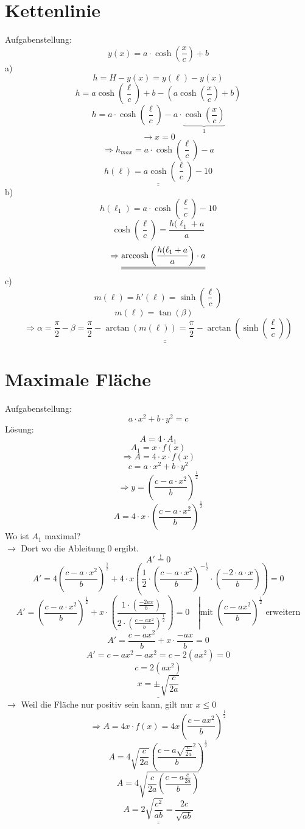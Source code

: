 \section{Kettenlinie}
Aufgabenstellung: 
\[y(x) = a \cdot \cosh\left(\frac{x}{c}\right) + b\]
a)\\
\[h = H - y(x) = y(\ell) - y(x)\]
\[h = a \cosh\left(\frac{\ell}{c}\right) + b - \left(a \cosh\left(\frac{x}{c}\right) + b\right)\]
\[h = a \cdot \cosh\left(\frac{\ell}{c}\right) - a \cdot \underbrace{\cosh\left(\frac{x}{c}\right)}_1\]
\[\rightarrow x = 0\]
\[\Rightarrow h_{max} = a \cdot \cosh\left(\frac{\ell}{c}\right)-a\]
\[\underline{\underline{h(\ell) = a \cosh\left(\frac{\ell}{c}\right) - 10}}\]
b)
\[h(\ell_1) =a \cdot \cosh\left(\frac{\ell}{c}\right) - 10\]
\[\cosh\left(\frac{\ell}{c}\right) = \frac{h(\ell_1 + a}{a}\]
\[\Rightarrow \underline{\underline{\operatorname{arccosh}\left(\frac{h(\ell_1 + a}{a}\right) \cdot a}}\]
c)
\[m(\ell) = h'(\ell) = \sinh\left(\frac{\ell}{c}\right)\]
\[m(\ell) = \tan(\beta) \quad\]
\[\Rightarrow \underline{\underline{\alpha = \frac{\pi}{2} - \beta = \frac{\pi}{2} - \arctan(m(\ell)) = \frac{\pi}{2} - \arctan(\sinh\left(\frac{\ell}{c}\right))}}\]
\section{Maximale Fläche}
Aufgabenstellung: \\
\[a \cdot x^2 + b \cdot y^2 = c\]
Lösung:
\[A = 4 \cdot A_1\]
\[A_1 = x \cdot f(x)\]
\[\Rightarrow A = 4 \cdot x \cdot f(x)\]
\[c = a \cdot x^2 + b \cdot y^2\]
\[\Rightarrow y = \left( \frac{c - a \cdot x^2}{b} \right)^{\frac{1}{2}}\]
\[A = 4 \cdot x \cdot \left( \frac{c - a \cdot x^2}{b} \right)^{\frac{1}{2}}\]
Wo ist $A_1$ maximal? \\
$\rightarrow$ Dort wo die Ableitung $0$ ergibt. 
\[A' \stackrel{!}{=} 0\]
\[A' = 4 \left(\frac{c - a \cdot x^2}{b}\right)^\frac{1}{2} + 4 \cdot x \left(\frac{1}{2} \cdot \left(\frac{c - a \cdot x^2}{b}\right)^{-\frac{1}{2}} \cdot \left(\frac{-2 \cdot a \cdot x}{b}\right)\right) = 0\]
\[A' = \left(\frac{c - a \cdot x^2}{b}\right)^{\frac{1}{2}} + x \cdot \left(\frac{1 \cdot \left(\frac{-2ax}{b}\right)}{2 \cdot \left(\frac{c - ax^2}{b}\right)^{\frac{1}{2}}}\right) = 0\quad \left|\text{mit }\left(\frac{c - ax^2}{b}\right)^{\frac{1}{2}} \right.\text{ erweitern}\]
\[A' = \frac{c - ax^2}{b} + x \cdot \frac{-ax}{b} = 0\]
\[A' = c - ax^2 - ax^2 = c - 2 \left(ax^2\right) = 0\]
\[c = 2 \left(ax^2\right)\]
\[\underline{x = \pm\sqrt{\frac{c}{2a}}}\]
$\rightarrow$ Weil die Fläche nur positiv sein kann, gilt nur $x \leq 0$
\[\Rightarrow A = 4 x \cdot f(x) = 4 x \left(\frac{c - ax^2}{b}\right)^{\frac{1}{2}}\]
\[A = 4 \sqrt{\frac{c}{2a}} \left(\frac{c - a \sqrt{\frac{c}{2a}}^2}{b}\right)^{\frac{1}{2}}\]
\[A = 4 \sqrt{\frac{c}{2a} \left(\frac{c - a \frac{c}{2a}}{b}\right)}\]
\[\underline{\underline{A = 2 \sqrt{\frac{c^2}{ab} } = \frac{2c}{\sqrt{ab}}}}\]
